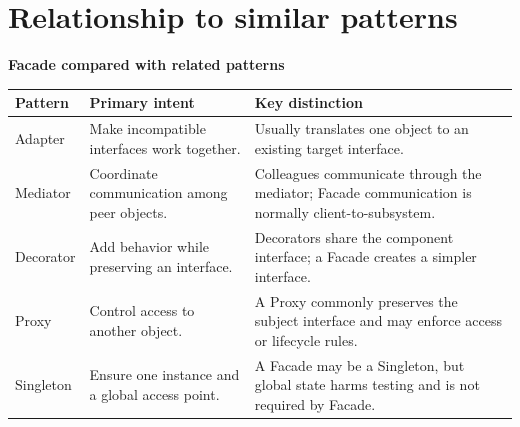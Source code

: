 \documentclass[11pt,a4paper]{report}
\begin{document}
\clearpage
\section{Relationship to similar patterns}
\begin{center}
\textbf{Facade compared with related patterns}\par\medskip
\centering
\small
\begin{tabularx}{\textwidth}{@{}lYY@{}}
\toprule
\textbf{Pattern} & \textbf{Primary intent} & \textbf{Key distinction} \\
\midrule
Adapter & Make incompatible interfaces work together. & Usually translates one object to an existing target interface. \\
Mediator & Coordinate communication among peer objects. & Colleagues communicate through the mediator; Facade communication is normally client-to-subsystem. \\
Decorator & Add behavior while preserving an interface. & Decorators share the component interface; a Facade creates a simpler interface. \\
Proxy & Control access to another object. & A Proxy commonly preserves the subject interface and may enforce access or lifecycle rules. \\
Singleton & Ensure one instance and a global access point. & A Facade may be a Singleton, but global state harms testing and is not required by Facade. \\
\bottomrule
\end{tabularx}
\end{center}
\end{document}

